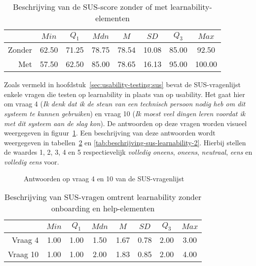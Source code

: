\begin{table}[h]
	\centering
	\begin{tabular}{r|ccccccc}
		& $Min$ & $Q_1$ & $Mdn$ & $M$ & $SD$ & $Q_3$ & $Max$ \\ \hline
		Zonder & 62.50 & 71.25 & 78.75 & 78.54 & 10.08 & 85.00 & 92.50 \\
		Met & 57.50 & 62.50 & 85.00 & 78.65 & 16.13 & 95.00 & 100.00
	\end{tabular}
	\caption{Beschrijving van de SUS-score zonder of met learnability-elementen}
	\label{tab:beschrijving-sus}
\end{table}

Zoals vermeld in hoofdstuk~\ref{sec:usability-testing:sus} bevat de SUS-vragenlijst enkele vragen die testen op learnability in plaats van op usability. Het gaat hier om vraag 4 (\textit{Ik denk dat ik de steun van een technisch persoon nodig heb om dit systeem te kunnen gebruiken}) en vraag 10 (\textit{Ik moest veel dingen leren voordat ik met dit systeem aan de slag kon}). De antwoorden op deze vragen worden visueel weergegeven in figuur~\ref{fig:beschrijving-sus}. Een beschrijving van deze antwoorden wordt weergegeven in tabellen~\ref{tab:beschrijving-sus-learnability-1} en \ref{tab:beschrijving-sus-learnability-2}. Hierbij stellen de waardes 1, 2, 3, 4 en 5 respectievelijk \textit{volledig oneens}, \textit{oneens}, \textit{neutraal}, \textit{eens} en \textit{volledig eens} voor.

\begin{figure}[h]
	\centering
	\qquad
	\caption{Antwoorden op vraag 4 en 10 van de SUS-vragenlijst}
	\label{fig:beschrijving-sus}
\end{figure}

\begin{table}[h]
	\centering
	\begin{tabular}{r|ccccccc}
		& $Min$ & $Q_1$ & $Mdn$ & $M$ & $SD$ & $Q_3$ & $Max$ \\ \hline
		Vraag 4 & 1.00 & 1.00 & 1.50 & 1.67 & 0.78 & 2.00 & 3.00 \\
		Vraag 10 & 1.00 & 1.00 & 2.00 & 1.83 & 0.85 & 2.00 & 4.00
	\end{tabular}
	\caption{Beschrijving van SUS-vragen omtrent learnability zonder onboarding en help-elementen}
	\label{tab:beschrijving-sus-learnability-1}
\end{table}

